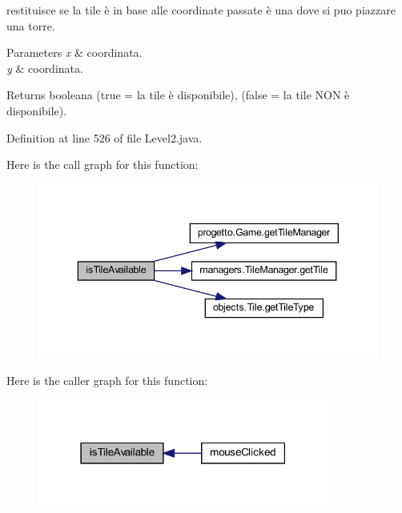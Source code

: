 restituisce se la tile è in base alle coordinate passate è una dove si puo piazzare una torre. 


\begin{DoxyParams}{Parameters}
{\em x} & coordinata. \\
\hline
{\em y} & coordinata.\\
\hline
\end{DoxyParams}
\begin{DoxyReturn}{Returns}
booleana (true = la tile è disponibile), (false = la tile N\+ON è disponibile). 
\end{DoxyReturn}


Definition at line 526 of file Level2.\+java.

Here is the call graph for this function\+:
\nopagebreak
\begin{figure}[H]
\begin{center}
\leavevmode
\includegraphics[width=343pt]{classscenes_1_1_level2_aaeac2ee6b3a920a21928ee7b3dc8e7a9_cgraph}
\end{center}
\end{figure}
Here is the caller graph for this function\+:\nopagebreak
\begin{figure}[H]
\begin{center}
\leavevmode
\includegraphics[width=271pt]{classscenes_1_1_level2_aaeac2ee6b3a920a21928ee7b3dc8e7a9_icgraph}
\end{center}
\end{figure}
\mbox{\label{classscenes_1_1_level2_ab68417e6738c05037923f5f0f21eb586}} 
